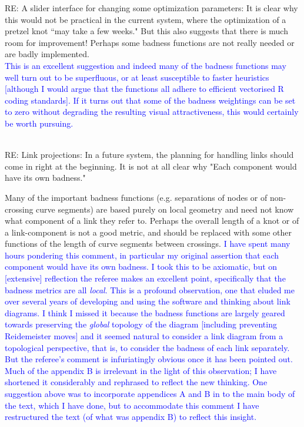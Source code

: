 \documentclass[12pt]{article}
\begin{document}
RE: A slider interface for changing some optimization parameters: It
is clear why this would not be practical in the current system, where
the optimization of a pretzel knot ``may take a few weeks."  But this
also suggests that there is much room for improvement!  Perhaps some
badness functions are not really needed or are badly implemented.
\textcolor{blue}{\\ This is an excellent suggestion and indeed many of
  the badness functions may well turn out to be superfluous, or at
  least susceptible to faster heuristics [although I would argue that
    the functions all adhere to efficient vectorised R coding
    standards].  If it turns out that some of the badness weightings
  can be set to zero without degrading the resulting visual
  attractiveness, this would certainly be worth pursuing.\\ \\}

RE: Link projections: In a future system, the planning for handling
links should come in right at the beginning.  It is not at all clear
why "Each component would have its own badness."

Many of the important badness functions (e.g. separations of nodes or
of non-crossing curve segments) are based purely on local geometry and
need not know what component of a link they refer to.  Perhaps the
overall length of a knot or of a link-component is not a good metric,
and should be replaced with some other functions of the length of
curve segments between crossings.  \textcolor{blue}{I have spent many
  hours pondering this comment, in particular my original assertion
  that each component would have its own badness.  I took this to be
  axiomatic, but on [extensive] reflection the referee makes an
  excellent point, specifically that the badness metrics are all {\em
    local}.  This is a profound observation, one that eluded me over
  several years of developing and using the software and thinking
  about link diagrams.  I think I missed it because the badness
  functions are largely geared towards preserving the {\em global}
  topology of the diagram [including preventing Reidemeister moves]
  and it seemed natural to consider a link diagram from a topological
  perspective, that is, to consider the badness of each link
  separately.  But the referee's comment is infuriatingly obvious once
  it has been pointed out.  Much of the appendix B is irrelevant in
  the light of this observation; I have shortened it considerably and
  rephrased to reflect the new thinking.  One suggestion above was to
  incorporate appendices A and B in to the main body of the text,
  which I have done, but to accommodate this comment I have
  restructured the text (of what was appendix B) to reflect this
  insight.\\ \\}
\end{document}
